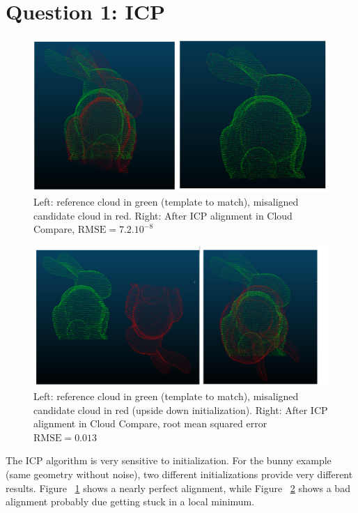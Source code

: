 \documentclass[a4paper]{article}
\begin{document}





\section{Question 1: ICP}
\begin{figure}[ht]
    \centering
    \includegraphics[width=0.8\linewidth]{figures/bunny_icp_cloud_compare.png}
    \caption{Left: reference cloud in green (template to match), misaligned candidate cloud in red. Right: After ICP alignment in Cloud Compare, $\text{RMSE}=7.2. 10^{-8}$}
    \label{fig:CC_alignment_ok}
\end{figure}

\begin{figure}[ht]
    \centering
    \includegraphics[width=0.8\linewidth]{figures/bunny_icp_upside_down_cloud_compare.png}
    \caption{Left: reference cloud in green (template to match), misaligned candidate cloud in red (upside down initialization). 
    Right: After ICP alignment in Cloud Compare, root mean squared error $\text{RMSE}=0.013$}
    \label{fig:CC_alignment_nok}
\end{figure}

The ICP algorithm is very sensitive to initialization. For the bunny example (same geometry without noise), two different initializations provide very different results.
Figure ~\ref{fig:CC_alignment_ok} shows a nearly perfect alignment, while Figure ~\ref{fig:CC_alignment_nok} shows a bad alignment probably due getting stuck in a local minimum.
\end{document}
